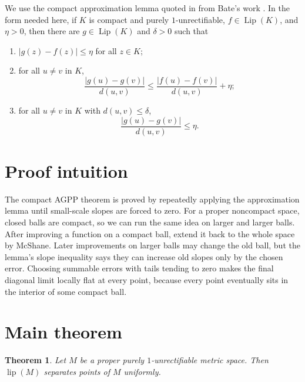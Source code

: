 \documentclass[11pt]{amsart}
\newtheorem{theorem}{Theorem}
\newcommand{\lip}{\operatorname{lip}}
\newcommand{\Lip}{\operatorname{Lip}}
\begin{document}
We use the compact approximation lemma quoted in \cite[Lemma 2.11]{Aliaga2606}
from Bate's work \cite{Bate}.  In the form needed here, if $K$ is compact and
purely $1$-unrectifiable, $f\in\Lip(K)$, and $\eta>0$, then there are
$g\in\Lip(K)$ and $\delta>0$ such that
\begin{enumerate}[label=(\roman*),leftmargin=*]
\item $|g(z)-f(z)|\leq\eta$ for all $z\in K$;
\item for all $u\neq v$ in $K$,
\[
  \frac{|g(u)-g(v)|}{d(u,v)}
  \leq
  \frac{|f(u)-f(v)|}{d(u,v)}+\eta;
\]
\item for all $u\neq v$ in $K$ with $d(u,v)\leq\delta$,
\[
  \frac{|g(u)-g(v)|}{d(u,v)}\leq\eta.
\]
\end{enumerate}

\section*{Proof intuition}

The compact AGPP theorem is proved by repeatedly applying the approximation
lemma until small-scale slopes are forced to zero.  For a proper noncompact
space, closed balls are compact, so we can run the same idea on larger and
larger balls.  After improving a function on a compact ball, extend it back to
the whole space by McShane.  Later improvements on larger balls may change the
old ball, but the lemma's slope inequality says they can increase old slopes
only by the chosen error.  Choosing summable errors with tails tending to zero
makes the final diagonal limit locally flat at every point, because every
point eventually sits in the interior of some compact ball.

\section*{Main theorem}

\begin{theorem}
\label{thm:proper}
Let $M$ be a proper purely $1$-unrectifiable metric space.  Then $\lip(M)$
separates points of $M$ uniformly.
\end{theorem}
\end{document}
